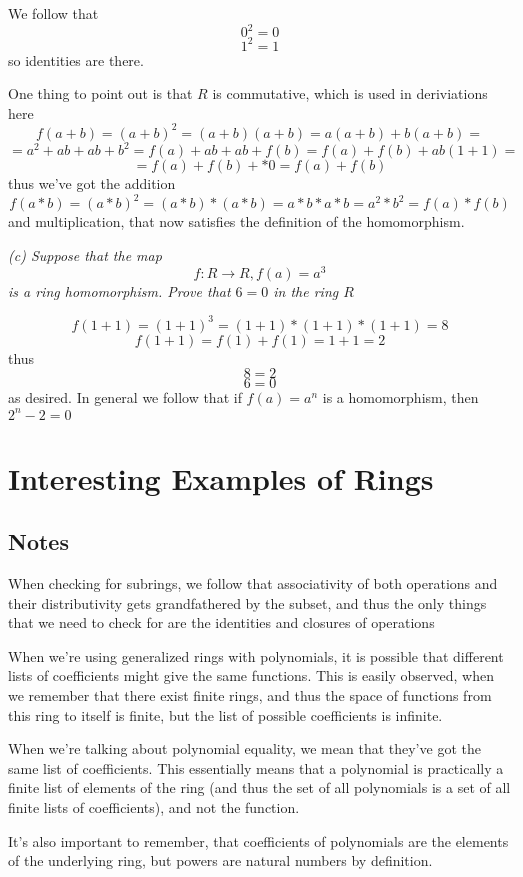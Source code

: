 \documentclass[11pt,oneside,titlepage]{book}
\begin{document}
We follow that
$$0^2 = 0$$
$$1^2 = 1$$
so identities are there.

One thing to point out is that $R$ is commutative, which is used in
deriviations here
$$f(a + b) = (a + b)^2 = (a + b)(a + b) = a(a + b) + b(a + b) = $$
$$ = a^2 + ab + ab + b^2 = f(a) + ab + ab + f(b) = f(a) + f(b) + ab(1 + 1) = $$
$$ = f(a) + f(b) +  * 0 = f(a) + f(b)$$
thus we've got the addition
$$f(a * b) = (a * b)^2 = (a * b) * (a * b) = a * b * a * b = a^2 * b^2 = f(a) * f(b)$$
and multiplication, that now satisfies the definition of the
homomorphism.

\textit{(c) Suppose that the map
  $$f: R \to R, f(a) = a^3$$
  is a ring homomorphism. Prove that $6 = 0$ in the ring $R$}

$$ f(1 + 1) = (1 + 1)^3 = (1 + 1) * (1 + 1) * (1 + 1) = 8$$
$$ f(1 + 1) = f(1) + f(1) = 1 + 1 = 2$$
thus
$$8 = 2$$
$$6 = 0$$
as desired. In general we follow that if $f(a) = a^n$ is a
homomorphism, then $2^n - 2 = 0$

\section{Interesting Examples of Rings}

\subsection*{Notes}

When checking for subrings, we follow that associativity of both
operations and their distributivity gets grandfathered by the subset,
and thus the only things that we need to check for are the identities
and closures of operations

When we're using generalized rings with polynomials, it is possible
that different lists of coefficients might give the same functions.
This is easily observed, when we remember that there exist finite
rings, and thus the space of functions from this ring to itself is
finite, but the list of possible coefficients is infinite.

When we're talking about polynomial equality, we mean that they've got
the same list of coefficients. This essentially means that a
polynomial is practically a finite list of elements of the ring (and
thus the set of all polynomials is a set of all finite lists of
coefficients), and not the function.

It's also important to remember, that coefficients of polynomials are
the elements of the underlying ring, but powers are natural numbers by
definition.
\end{document}
